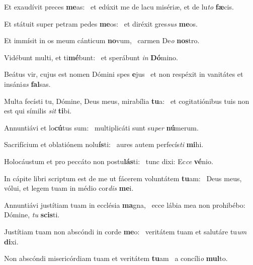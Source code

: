 \item Et exaudívit preces \textbf{me}as:~\psstar{} et edúxit me de lacu misériæ, et de lu\textit{to} \textbf{fæ}cis.

\item Et státuit super petram pedes \textbf{me}os:~\psstar{} et diréxit gres\textit{sus} \textbf{me}os.

\item Et immísit in os meum cánticum \textbf{no}vum,~\psstar{} carmen De\textit{o} \textbf{nos}tro.

\item Vidébunt multi, et ti\textbf{mé}bunt:~\psstar{} et sperábunt \textit{in} \textbf{Dó}mino.

\item Beátus vir, cujus est nomen Dómini spes \textbf{e}jus~\psstar{} et non respéxit in vanitátes et insáni\textit{as} \textbf{fal}sas.

\item Multa fecísti tu, Dómine, Deus meus, mirabília \textbf{tu}a:~\psstar{} et cogitatiónibus tuis non est qui símilis \textit{sit} \textbf{ti}bi.

\item Annuntiávi et lo\textbf{cú}tus sum:~\psstar{} multiplicáti sunt su\textit{per} \textbf{nú}merum.

\item Sacrifícium et oblatiónem nolu\textbf{ís}ti:~\psstar{} aures autem perfecís\textit{ti} \textbf{mi}hi.

\item Holocáustum et pro peccáto non postu\textbf{lás}ti:~\psstar{} tunc dixi: Ec\textit{ce} \textbf{vé}nio.

\item In cápite libri scriptum est de me ut fácerem voluntátem \textbf{tu}am:~\psstar{} Deus meus, vólui, et legem tuam in médio cor\textit{dis} \textbf{me}i.

\item Annuntiávi justítiam tuam in ecclésia \textbf{ma}gna,~\psstar{} ecce lábia mea non prohibébo: Dómine, \textit{tu} \textbf{scis}ti.

\item Justítiam tuam non abscóndi in corde \textbf{me}o:~\psstar{} veritátem tuam et salutáre tu\textit{um} \textbf{di}xi.

\item Non abscóndi misericórdiam tuam et veritátem \textbf{tu}am~\psstar{} a concíli\textit{o} \textbf{mul}to.

